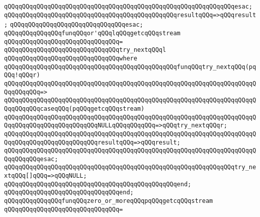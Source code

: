 \verb|qQQqqQQqqQQqqQQqqQQqqQQqqQQqqQQqqQQqqQQqqQQqqQQqqQQqqQQqqQQqqQQqesac;|\newline
\newline
\verb|qQQqqQQqqQQqqQQqqQQqqQQqqQQqqQQqqQQqqQQqqQQqqQQqresultqQQq=>qQQqresult;|\newline
\newline
\verb|qQQqqQQqqQQqqQQqqQQqqQQqqQQqqQQqesac;|\newline
\newline
\newline
\verb|qQQqqQQqqQQqqQQqfunqQQqor'qQQqlqQQqgetcqQQqstream|\newline
\verb|qQQqqQQqqQQqqQQqqQQqqQQqqQQqqQQq=|\newline
\verb|qQQqqQQqqQQqqQQqqQQqqQQqqQQqqQQqtry_nextqQQql|\newline
\verb|qQQqqQQqqQQqqQQqqQQqqQQqqQQqqQQqwhere|\newline
\newline
\verb|qQQqqQQqqQQqqQQqqQQqqQQqqQQqqQQqqQQqqQQqqQQqqQQqfunqQQqtry_nextqQQq(pqQQq!qQQqr)|\newline
\verb|qQQqqQQqqQQqqQQqqQQqqQQqqQQqqQQqqQQqqQQqqQQqqQQqqQQqqQQqqQQqqQQqqQQqqQQqqQQqqQQq=>|\newline
\verb|qQQqqQQqqQQqqQQqqQQqqQQqqQQqqQQqqQQqqQQqqQQqqQQqqQQqqQQqqQQqqQQqqQQqqQQqqQQqqQQqcaseqQQq(pqQQqgetcqQQqstream)|\newline
\verb|qQQqqQQqqQQqqQQqqQQqqQQqqQQqqQQqqQQqqQQqqQQqqQQqqQQqqQQqqQQqqQQqqQQqqQQqqQQqqQQqqQQqqQQqqQQqqQQqNULLqQQqqQQqqQQq=>qQQqtry_nextqQQqr;|\newline
\verb|qQQqqQQqqQQqqQQqqQQqqQQqqQQqqQQqqQQqqQQqqQQqqQQqqQQqqQQqqQQqqQQqqQQqqQQqqQQqqQQqqQQqqQQqqQQqqQQqresultqQQq=>qQQqresult;|\newline
\verb|qQQqqQQqqQQqqQQqqQQqqQQqqQQqqQQqqQQqqQQqqQQqqQQqqQQqqQQqqQQqqQQqqQQqqQQqqQQqqQQqesac;|\newline
\newline
\verb|qQQqqQQqqQQqqQQqqQQqqQQqqQQqqQQqqQQqqQQqqQQqqQQqqQQqqQQqqQQqqQQqtry_nextqQQq[]qQQq=>qQQqNULL;|\newline
\verb|qQQqqQQqqQQqqQQqqQQqqQQqqQQqqQQqqQQqqQQqqQQqqQQqend;|\newline
\verb|qQQqqQQqqQQqqQQqqQQqqQQqqQQqqQQqend;|\newline
\newline
\newline
\verb|qQQqqQQqqQQqqQQqfunqQQqzero_or_moreqQQqpqQQqgetcqQQqstream|\newline
\verb|qQQqqQQqqQQqqQQqqQQqqQQqqQQqqQQq=|\newline
